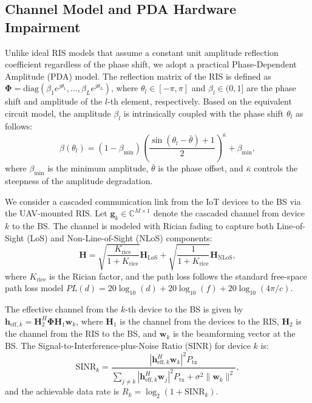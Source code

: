 \documentclass[journal]{IEEEtran}
\begin{document}
\subsection{Channel Model and PDA Hardware Impairment}
Unlike ideal RIS models that assume a constant unit amplitude reflection coefficient regardless of the phase shift, we adopt a practical Phase-Dependent Amplitude (PDA) model. The reflection matrix of the RIS is defined as $\mathbf{\Phi} = \text{diag}(\beta_1 e^{j\theta_1}, \dots, \beta_L e^{j\theta_L})$, where $\theta_l \in [-\pi, \pi]$ and $\beta_l \in (0, 1]$ are the phase shift and amplitude of the $l$-th element, respectively. Based on the equivalent circuit model, the amplitude $\beta_l$ is intrinsically coupled with the phase shift $\theta_l$ as follows:
\begin{equation}
    \beta(\theta_l) = (1 - \beta_{\text{min}}) \left( \frac{\sin(\theta_l - \bar{\theta}) + 1}{2} \right)^{\bar{\kappa}} + \beta_{\text{min}},
    \label{eq:pda}
\end{equation}
where $\beta_{\text{min}}$ is the minimum amplitude, $\bar{\theta}$ is the phase offset, and $\bar{\kappa}$ controls the steepness of the amplitude degradation.

We consider a cascaded communication link from the IoT devices to the BS via the UAV-mounted RIS. Let $\mathbf{g}_k \in \mathbb{C}^{M \times 1}$ denote the cascaded channel from device $k$ to the BS. The channel is modeled with Rician fading to capture both Line-of-Sight (LoS) and Non-Line-of-Sight (NLoS) components:
\begin{equation}
    \mathbf{H} = \sqrt{\frac{K_{\text{rice}}}{1 + K_{\text{rice}}}} \mathbf{H}_{\text{LoS}} + \sqrt{\frac{1}{1 + K_{\text{rice}}}} \mathbf{H}_{\text{NLoS}},
\end{equation}
where $K_{\text{rice}}$ is the Rician factor, and the path loss follows the standard free-space path loss model $PL(d) = 20\log_{10}(d) + 20\log_{10}(f) + 20\log_{10}(4\pi/c)$.

The effective channel from the $k$-th device to the BS is given by $\mathbf{h}_{\text{eff},k} = \mathbf{H}_2^H \mathbf{\Phi} \mathbf{H}_1 \mathbf{w}_k$, where $\mathbf{H}_1$ is the channel from the devices to the RIS, $\mathbf{H}_2$ is the channel from the RIS to the BS, and $\mathbf{w}_k$ is the beamforming vector at the BS. The Signal-to-Interference-plus-Noise Ratio (SINR) for device $k$ is:
\begin{equation}
    \text{SINR}_k = \frac{|\mathbf{h}_{\text{eff},k}^H \mathbf{w}_k|^2 P_{\text{tx}}}{\sum_{j \neq k} |\mathbf{h}_{\text{eff},k}^H \mathbf{w}_j|^2 P_{\text{tx}} + \sigma^2 \|\mathbf{w}_k\|^2},
\end{equation}
and the achievable data rate is $R_k = \log_2(1 + \text{SINR}_k)$.
\end{document}
